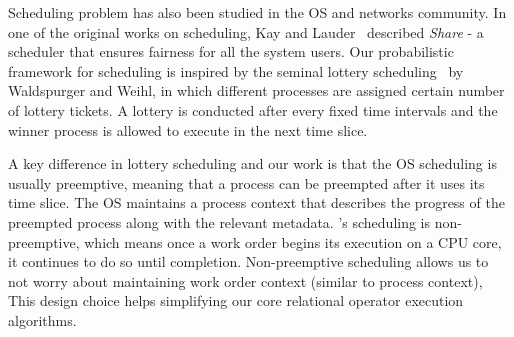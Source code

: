 
Scheduling problem has also been studied in the OS and networks community. 
In one of the original works on scheduling, Kay and Lauder~\cite{kay1988fair} described \textit{Share} -  a scheduler that ensures fairness for all the system users.
Our probabilistic framework for scheduling is inspired by the seminal lottery scheduling~\cite{lottery-scheduling} by Waldspurger and Weihl,
in which different processes are assigned certain number of lottery tickets. 
A lottery is conducted after every fixed time intervals and the winner process is allowed to execute in the next time slice. 

A key difference in lottery scheduling and our work is that the OS scheduling is usually preemptive, meaning that a process can be preempted after it uses its time slice. 
The OS maintains a process context that describes the progress of the preempted process along with the relevant metadata. 
\sys{}'s scheduling is non-preemptive, which means once a work order begins its execution on a CPU core, it continues to do so until completion.
Non-preemptive scheduling allows us to not worry about maintaining work order context (similar to process context), 
This design choice helps simplifying our core relational operator execution algorithms.

